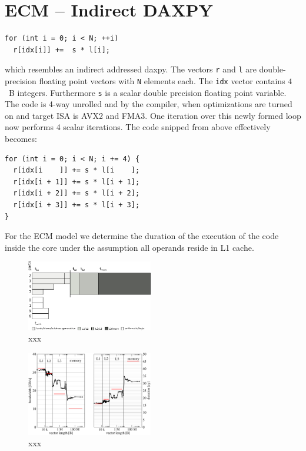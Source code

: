 \section{ECM -- Indirect DAXPY}

%
\begin{lstlisting}
for (int i = 0; i < N; ++i) 
  r[idx[i]] +=  s * l[i];
\end{lstlisting}
%
which resembles an indirect addressed daxpy.
The vectors \verb'r' and
\verb'l' are double-precision floating point vectors with \verb'N' elements
each. 
The \verb'idx' vector contains $4$~B integers.
Furthermore \verb's' is a scalar double precision floating point variable.
%
The code is 4-way unrolled and by the compiler, when
optimizations are turned on and target ISA is AVX2 and FMA3. One iteration
over this newly formed loop now performs 4 scalar iterations. The code snipped
from above effectively becomes:
%
\begin{lstlisting}
for (int i = 0; i < N; i += 4) {
  r[idx[i    ]] += s * l[i    ];
  r[idx[i + 1]] += s * l[i + 1];
  r[idx[i + 2]] += s * l[i + 2];
  r[idx[i + 3]] += s * l[i + 3];
}
\end{lstlisting}
%
For the ECM model we determine the duration of the execution of the code inside
the core under the assumption all operands reside in L1 cache.

\begin{figure}[tp]
  \centering
  \includegraphics[width=0.49\textwidth,clip=true]{images/ecm-hsw-daxpy-indirect}
  \caption{xxx}
  \label{fig:xxx}
\end{figure}

\begin{figure}[tp]
  \centering
  \includegraphics[width=0.49\textwidth,clip=true]{images/daxpy-indirect-bw-hasep1-f-2.3-w-cy}
  \caption{xxx}
  \label{fig:daxpy-indirect:perf}
\end{figure}

